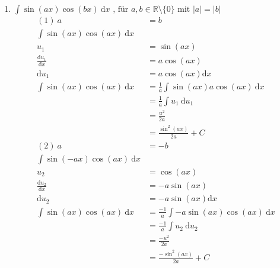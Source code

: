 \documentclass[10pt]{article}
\begin{document}
\begin{enumerate}[start=5,leftmargin=1in]
\begin{enumerate}
        \item $\int \sin(ax) \cos(bx) \: \text{d}x \text{ , für } a,b \in \mathbb{R} \setminus \{0\} \text{ mit } |a| = |b|$
        \begin{align*}
            (1) \: a &= b \\
            \int \sin(ax) \cos(ax) \: \text{d}x \\
            u_1 &= \sin(ax) \\
            \frac{\text{d}u_1}{\text{d}x} &= a \cos(ax) \\
            \text{d}u_1 &= a \cos(ax) \text{d}x \\
            \int \sin(ax) \cos(ax) \: \text{d}x &= \frac{1}{a} \int \sin(ax) a \cos(ax) \: \text{d}x \\
            &= \frac{1}{a} \int u_1 \: \text{d}u_1 \\
            &= \frac{u^2}{2a} \\
            &= \frac{\sin^2(ax)}{2a} + C \\
            (2) \: a &= -b \\
            \int \sin(-ax) \cos(ax) \: \text{d}x \\
            u_2 &= \cos(ax) \\
            \frac{\text{d}u_2}{\text{d}x} &= -a \sin(ax) \\
            \text{d}u_2 &= -a \sin(ax) \text{d}x \\
            \int \sin(ax) \cos(ax) \: \text{d}x &= \frac{-1}{a} \int -a \sin(ax) \cos(ax) \: \text{d}x \\
            &= \frac{-1}{a} \int u_2 \: \text{d}u_2 \\
            &= \frac{-u^2}{2a} \\
            &= \frac{-\sin^2(ax)}{2a} + C
        \end{align*}

    \end{enumerate}
\end{enumerate}
\end{document}
